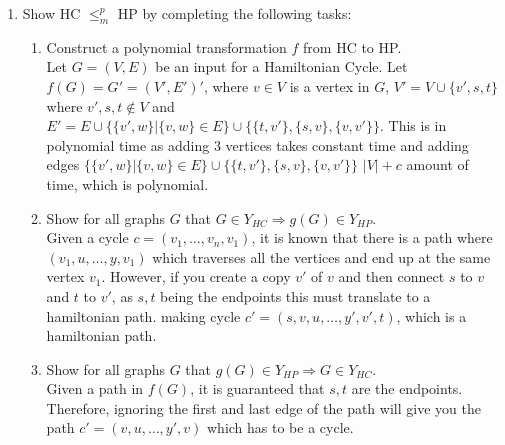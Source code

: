 \documentclass[11pt,a4paper]{article}
\newcommand{\hc} {HC}
\newcommand{\hp} {HP}
\begin{document}
\begin{enumerate}
\begin{enumerate}
            
        \end{enumerate}
    \item Show \hc{} $\leq^p_m$ \hp{} by completing the following tasks: 
    \begin{enumerate}
        \item Construct a polynomial transformation $f$ from \hc{} to \hp{}.\\
        Let $G = (V, E)$ be an input for a Hamiltonian Cycle. Let $f(G) = G'  = (V', E')'$,
             where $v \in V$ is a vertex in $G$, $V' = V \cup \{v', s, t\}$  where $v', s, t \notin V$ and $E' = E \cup \{ \{v',w\} | \{v, w\} \in E \} \cup \{ \{ t, v' \}, \{s, v\}, \{v, v'\} \}$.
             This is in polynomial time as adding 3 vertices takes constant time and adding edges $\{ \{v',w\} | \{v, w\} \in E \} \cup \{ \{ t, v' \}, \{s, v\}, \{v, v'\} \}$
            $|V| + c$ amount of time, which is polynomial. 
        \item Show for all graphs $G$ that $G \in Y_{\hc{}} \Rightarrow g(G) \in Y_{\hp{}}$.\\
        Given a cycle $c = (v_1, \ldots, v_n, v_1)$, it is known that there is a path where $(v_1, u, \dots, y, v_1)$ which traverses all the vertices and end up at the same vertex $v_1$.
         However, if you create a copy $v'$ of $v$ and then connect $s$ to $v$ and $t$ to $v'$, as $s, t$ being the endpoints this must translate to a hamiltonian path.
         making cycle $c' = (s,v,u,\ldots , y', v', t)$, which is a hamiltonian path.
               
        \item Show for all graphs $G$ that $g(G) \in Y_{\hp{}} \Rightarrow G \in Y_{\hc{}}$.\\
        Given a path in $f(G)$, it is guaranteed that $s, t$ are the endpoints. Therefore, ignoring the first and last edge of the path will give you the path $c' = (v,u,\ldots , y', v)$ which has to be a cycle.
    \end{enumerate}
\end{enumerate}
\end{document}
